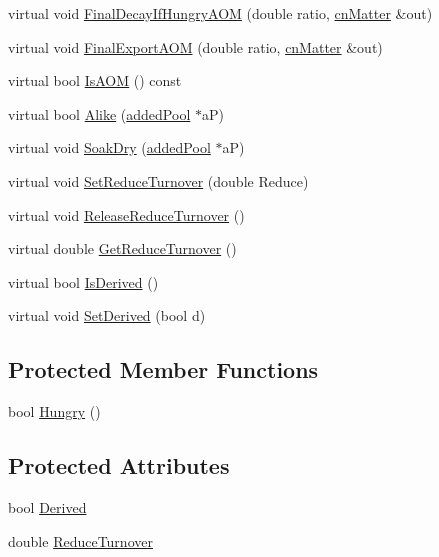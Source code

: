 \begin{DoxyCompactItemize}
virtual void \hyperlink{classadded_pool_ac19f010f6512bfb4f8ffaa9071e1251d}{FinalDecayIfHungryAOM} (double ratio, \hyperlink{classcn_matter}{cnMatter} \&out)
\item 
virtual void \hyperlink{classadded_pool_a6c1df7303f53a6c6693a371f0a0f760a}{FinalExportAOM} (double ratio, \hyperlink{classcn_matter}{cnMatter} \&out)
\item 
virtual bool \hyperlink{classadded_pool_afdb519f965dcf836634edfa30752d888}{IsAOM} () const 
\item 
virtual bool \hyperlink{classadded_pool_abbe1f7d292ff1224735bde06dd38eaa6}{Alike} (\hyperlink{classadded_pool}{addedPool} $\ast$aP)
\item 
virtual void \hyperlink{classadded_pool_afa0b865f26d4f7993142f7564de33056}{SoakDry} (\hyperlink{classadded_pool}{addedPool} $\ast$aP)
\item 
virtual void \hyperlink{classadded_pool_a4df8c3d4eb189579d3ba7f620e277598}{SetReduceTurnover} (double Reduce)
\item 
virtual void \hyperlink{classadded_pool_a53baccaba22ddacc656b75d90d32fa15}{ReleaseReduceTurnover} ()
\item 
virtual double \hyperlink{classadded_pool_a751b3e1eab19b4b6efc87c160e79a016}{GetReduceTurnover} ()
\item 
virtual bool \hyperlink{classadded_pool_a526f6f9fdd771c22b602cce6f756307f}{IsDerived} ()
\item 
virtual void \hyperlink{classadded_pool_a59c036e02555c4472128b90eb067f288}{SetDerived} (bool d)
\end{DoxyCompactItemize}
\subsection*{Protected Member Functions}
\begin{DoxyCompactItemize}
\item 
bool \hyperlink{classadded_pool_afec00b85b540b1d368dd51e1528e6aba}{Hungry} ()
\end{DoxyCompactItemize}
\subsection*{Protected Attributes}
\begin{DoxyCompactItemize}
\item 
bool \hyperlink{classadded_pool_ad9e02a173998be72b421c76b2807e33c}{Derived}
\item 
double \hyperlink{classadded_pool_a50a8a0c125b2e0ba0c0e3b07128c9d6c}{ReduceTurnover}
\end{DoxyCompactItemize}


